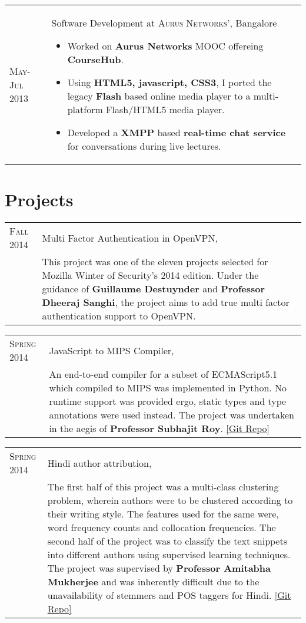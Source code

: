 \documentclass[a4paper,10pt]{article} %
\newcommand{\project}[3]{
    \begin{tabular}{>{\raggedleft}p{2.2cm}|p{16.5cm}}
        \textsc{#1} & #2 \\
                    & \footnotesize{#3} \\
    \end{tabular}
}
\newcommand{\projectlist}[3]{
    \begin{tabular}{>{\raggedleft}p{2.2cm}|p{16.5cm}}
        \textsc{#1} & #2
                    \footnotesize{#3}
    \end{tabular}
}
\begin{document}
\projectlist {May-Jul 2013}
         {Software Development at \textsc{Aurus Networks'}, Bangalore}
         {
            \begin{itemize}[leftmargin=*]
                \item Worked on \textbf{Aurus Networks} MOOC offereing \textbf{CourseHub}.
                \item Using \textbf{HTML5, javascript, CSS3}, I ported the legacy
                      \textbf{Flash} based online media player to a multi-platform
                      Flash/HTML5 media player.
                  \item Developed a \textbf{XMPP} based \textbf{real-time chat service} for
                      conversations during live lectures.
            \end{itemize}
        }

\section{Projects}

\project {Fall 2014}
         {Multi Factor Authentication in OpenVPN, \textsc{\raggedright Mozilla Winter of Security}}
         {This project was one of the eleven projects selected for Mozilla Winter of Security's 2014 edition.
         Under the guidance of \textbf{Guillaume Destuynder} and \textbf{Professor Dheeraj Sanghi},
         the project aims to add true multi factor authentication support to OpenVPN.}

\project {Spring 2014}
         {JavaScript to MIPS Compiler, \textsc{\raggedright Compilers}}
         {An end-to-end compiler for a subset of ECMAScript5.1 which compiled to MIPS was implemented in Python.
          No runtime support was provided ergo, static types and type annotations were used instead.
          The project was undertaken in the aegis of \textbf{Professor Subhajit Roy}.
          \href{https://github.com/srijanshetty/javascript-compiler} {[Git Repo]}}

\project {Spring 2014}
         {Hindi author attribution, \textsc{\raggedright Artificial Intelligence}}
         {The first half of this project was a multi-class clustering problem,
          wherein authors were to be clustered according to their writing style.
          The features used for the same were, word frequency counts and collocation
          frequencies.  The second half of the project was to classify the text snippets
          into different authors using supervised learning techniques.
          The project was supervised by \textbf{Professor Amitabha Mukherjee} and was
          inherently difficult due to the unavailability of stemmers and POS taggers for Hindi.
          \href{https://github.com/srijanshetty/author-attribution} {[Git Repo]}}
\end{document}
